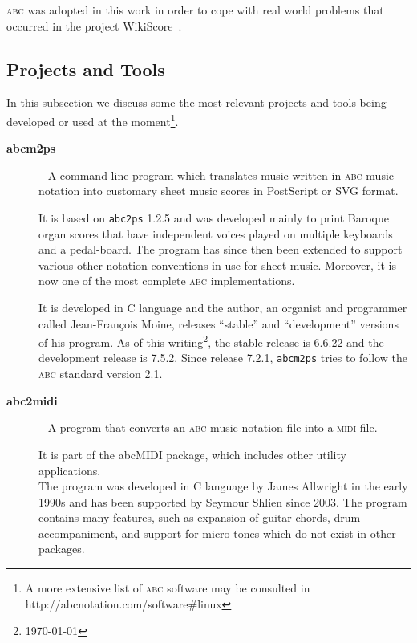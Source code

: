 \documentclass[a4paper,UKenglish]{oasics}
\newcommand{\abc}{\textsc{abc}}
\newcommand{\midi}{\textsc{midi} }
\newcommand{\abcmtops}{\texttt{abcm2ps}}
\begin{document}
    \abc{} was adopted in this work in order to cope with real world problems that occurred in the
    project WikiScore~\cite{almeida2012wiki}.

\subsection{Projects and Tools} 

    In this subsection we discuss some the most relevant projects and tools being developed or used
    at the moment\footnote{A more extensive list of \abc{} software may be consulted in
    http://abcnotation.com/software\#linux}.

    \begin{description}
      \item[\textbf{abcm2ps}]~\cite{abcm2ps:Online}
        A command line program which translates music written in \abc{} music notation
        into customary sheet music scores in PostScript or SVG format.

        It is based on \texttt{abc2ps} 1.2.5 and was developed mainly to print Baroque organ scores
        that have independent voices played on multiple keyboards and a pedal-board. The  program
        has since then been extended to support various other notation conventions in use for sheet
        music. Moreover, it is now one of the most complete \abc{} implementations.

        It is developed in C language and the author, an organist and programmer called
        Jean-François Moine, releases “stable” and “development” versions of his program. As of this
        writing\footnote{\today}, the stable release is 6.6.22 and the development release is 7.5.2.
        Since release 7.2.1, \abcmtops{} tries to follow the \abc{} standard
        version 2.1.

      \item[\textbf{abc2midi}]~\cite{abc2midi:Online}
        A program that converts an \abc{} music notation file into a \midi file.
        
        It is part of the abcMIDI package, which includes other utility applications.\\ The program
        was developed in C language by James Allwright in the early 1990s and has been supported by
        Seymour Shlien since 2003. The program contains many features, such as expansion of guitar
        chords, drum accompaniment, and support for micro tones which do not exist in other
        packages.


\end{description}
\end{document}
